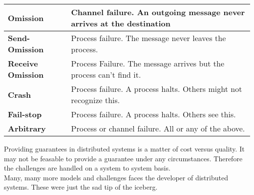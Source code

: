 \pagebreak
 \label{tab:title}
\begin{tabular}{L{1.0in} L{3.45in} }    %
\toprule[1.5pt] %

\textbf{Omission} & Channel failure. An outgoing message never arrives at the destination \\\midrule
 
\textbf{Send-Omission} & Process failure. The message never leaves the process.\\\midrule
 
\textbf{Receive Omission} & Process Failure. The message arrives but the process can't find it.\\\midrule
 
\textbf{Crash} & Process failure. A process halts. Others might not recognize this.\\\midrule
 
\textbf{Fail-stop} & Process failure. A process halts. Others see this.\\\midrule
 
\textbf{Arbitrary} &  Process or channel failure. All or any of the above.\\

\bottomrule[1.25pt] %
\end {tabular}\par
\bigskip

Providing guarantees in distributed systems is a matter of cost versus quality. It may not be feasable to provide a guarantee under any circumstances. Therefore the challenges are handled on a system to system basis.\\ 

Many, many more models and challenges faces the developer of distributed systems. These were just the sad tip of the iceberg.
